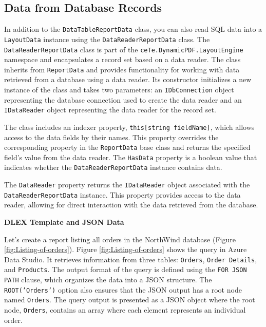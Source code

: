 \documentclass[american]{tufte-book}
\numberwithin{equation}{section}
\numberwithin{figure}{section}
\begin{document}
{{\subsection{Data from Database Records}

In addition to the \texttt{DataTableReportData} class, you can also
read SQL data into a \texttt{LayoutData} instance using the \texttt{DataReaderReportData}
class. The \texttt{DataReaderReportData} class is part of the \texttt{ceTe.DynamicPDF\allowbreak.LayoutEngine}
namespace and encapsulates a record set based on a data reader. The
class inherits from \texttt{ReportData} and provides functionality
for working with data retrieved from a database using a data reader.
Its constructor initializes a new instance of the class and takes
two parameters: an \texttt{IDbConnection} object representing the
database connection used to create the data reader and an \texttt{IDataReader}
object representing the data reader for the record set.

The class includes an indexer property, \texttt{this[string fieldName]},
which allows access to the data fields by their names. This property
overrides the corresponding property in the \texttt{ReportData} base
class and returns the specified field's value from the data reader.
The \texttt{HasData} property is a boolean value that indicates whether
the \texttt{DataReaderReportData} instance contains data.

The \texttt{DataReader} property returns the \texttt{IDataReader}
object associated with the \texttt{DataReaderReportData} instance.
This property provides access to the data reader, allowing for direct
interaction with the data retrieved from the database.
\noindent\begin{flushleft}
\textbf{DLEX Template and JSON Data}
\par\end{flushleft}

Let's create a report listing all orders in the NorthWind database
(Figure \ref{fig:Listing-of-orders}). Figure \ref{fig:Listing-of-orders}
shows the query in Azure Data Studio. It retrieves information from
three tables: \texttt{Orders}, \texttt{Order Details}, and \texttt{Products}.
The output format of the query is defined using the \texttt{FOR JSON
PATH} clause, which organizes the data into a JSON structure. The
\texttt{ROOT('Orders')} option also ensures that the JSON output has
a root node named \texttt{Orders}. The query output is presented as
a JSON object where the root node, \texttt{Orders}, contains an array
where each element represents an individual order.

}}
\end{document}
